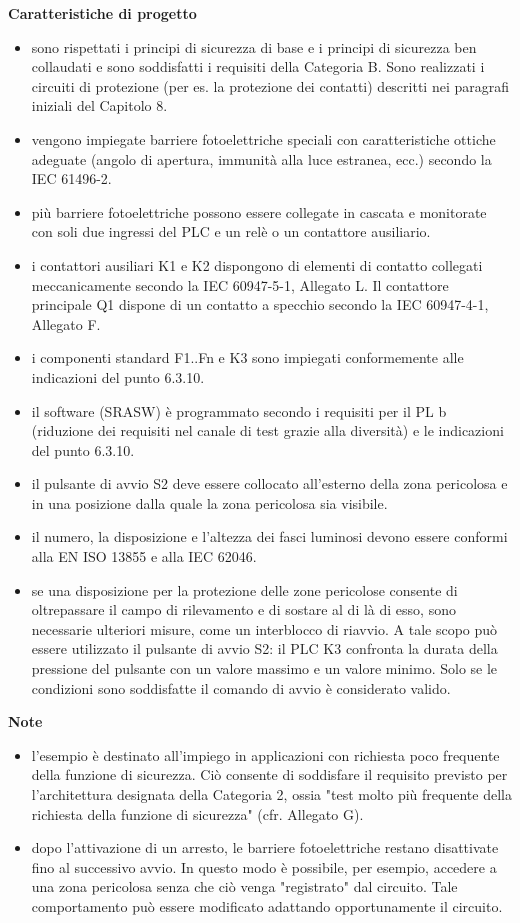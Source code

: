 \textbf{Caratteristiche di progetto}
\begin{itemize}
    \item sono rispettati i principi di sicurezza di base e i principi di sicurezza ben collaudati e sono soddisfatti i requisiti della Categoria B. Sono realizzati i circuiti di protezione (per es. la protezione dei contatti) descritti nei paragrafi iniziali del Capitolo 8.
    \item vengono impiegate barriere fotoelettriche speciali con caratteristiche ottiche adeguate (angolo di apertura, immunità alla luce estranea, ecc.) secondo la IEC 61496-2.
    \item più barriere fotoelettriche possono essere collegate in cascata e monitorate con soli due ingressi del PLC e un relè o un contattore ausiliario.
    \item i contattori ausiliari K1 e K2 dispongono di elementi di contatto collegati meccanicamente secondo la IEC 60947-5-1, Allegato L. Il contattore principale Q1 dispone di un contatto a specchio secondo la IEC 60947-4-1, Allegato F.
    \item i componenti standard F1..Fn e K3 sono impiegati conformemente alle indicazioni del punto 6.3.10.
    \item il software (SRASW) è programmato secondo i requisiti per il PL b (riduzione dei requisiti nel canale di test grazie alla diversità) e le indicazioni del punto 6.3.10.
    \item il pulsante di avvio S2 deve essere collocato all'esterno della zona pericolosa e in una posizione dalla quale la zona pericolosa sia visibile.
    \item il numero, la disposizione e l'altezza dei fasci luminosi devono essere conformi alla EN ISO 13855 e alla IEC 62046.
    \item se una disposizione per la protezione delle zone pericolose consente di oltrepassare il campo di rilevamento e di sostare al di là di esso, sono necessarie ulteriori misure, come un interblocco di riavvio. A tale scopo può essere utilizzato il pulsante di avvio S2: il PLC K3 confronta la durata della pressione del pulsante con un valore massimo e un valore minimo. Solo se le condizioni sono soddisfatte il comando di avvio è considerato valido.
\end{itemize}

\textbf{Note}
\begin{itemize}
    \item l'esempio è destinato all'impiego in applicazioni con richiesta poco frequente della funzione di sicurezza. Ciò consente di soddisfare il requisito previsto per l'architettura designata della Categoria 2, ossia "test molto più frequente della richiesta della funzione di sicurezza" (cfr. Allegato G).
    \item dopo l'attivazione di un arresto, le barriere fotoelettriche restano disattivate fino al successivo avvio. In questo modo è possibile, per esempio, accedere a una zona pericolosa senza che ciò venga "registrato" dal circuito. Tale comportamento può essere modificato adattando opportunamente il circuito.
\end{itemize}

